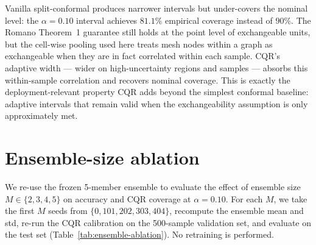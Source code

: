 \documentclass{article}
\begin{document}
\begin{table}[h]
  \centering
  \caption{Vanilla split-conformal (constant-width) vs.\ CQR
    (adaptive-width) on the ID test set, cell-wise pooled. $2Q$ and
    width are reported in MPa.}
  \label{tab:vanilla-vs-cqr}
\end{table}

Vanilla split-conformal produces narrower intervals but under-covers
the nominal level: the $\alpha=0.10$ interval achieves $81.1\%$
empirical coverage instead of $90\%$. The Romano Theorem~1 guarantee
still holds at the point level of exchangeable units, but the cell-wise
pooling used here treats mesh nodes within a graph as exchangeable
when they are in fact correlated within each sample. CQR's adaptive
width --- wider on high-uncertainty regions and samples --- absorbs
this within-sample correlation and recovers nominal coverage. This is
exactly the deployment-relevant property CQR adds beyond the simplest
conformal baseline: adaptive intervals that remain valid when the
exchangeability assumption is only approximately met.

\section{Ensemble-size ablation}
\label{app:ensemble-ablation}

We re-use the frozen 5-member ensemble to evaluate the effect of
ensemble size $M \in \{2, 3, 4, 5\}$ on accuracy and CQR coverage at
$\alpha=0.10$. For each $M$, we take the first $M$ seeds from
$\{0, 101, 202, 303, 404\}$, recompute the ensemble mean and std,
re-run the CQR calibration on the 500-sample validation set, and
evaluate on the test set (Table~\ref{tab:ensemble-ablation}). No
retraining is performed.
\end{document}
